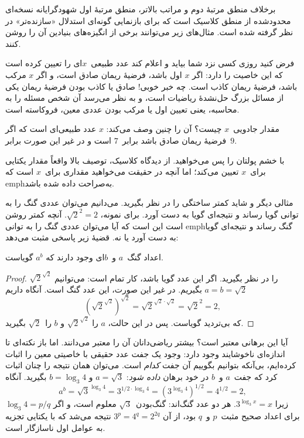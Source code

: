 \documentclass[../../../include/open-logic-section]{subfiles}
\begin{document}


برخلاف منطق مرتبهٔ دوم و مراتب بالاتر، منطق مرتبهٔ اول شهودگرایانه
نسخه‌ای محدودشده از منطق کلاسیک است که برای بازنمایی گونه‌ای استدلال
«سازنده‌تر» در نظر گرفته شده است. مثال‌های زیر می‌توانند برخی از
انگیزه‌های بنیادین آن را روشن کنند.

فرض کنید روزی کسی نزد شما بیاید و اعلام کند عدد طبیعی~$x$ای را تعیین
کرده است که این خاصیت را دارد: اگر $x$ اول باشد، فرضیهٔ ریمان صادق است،
و اگر $x$ مرکب باشد، فرضیهٔ ریمان کاذب است. چه خبر خوبی!{} صادق یا کاذب
بودن فرضیهٔ ریمان یکی از مسائل بزرگ حل‌نشدهٔ ریاضیات است، و به نظر
می‌رسد آن شخص مسئله را به محاسبه، یعنی تعیین اول یا مرکب بودن عددی
معین، فروکاسته است.

مقدار جادویی~$x$ چیست؟ آن را چنین وصف می‌کند: $x$ عدد طبیعی‌ای است که
اگر فرضیهٔ ریمان صادق باشد برابر~$7$ است و در غیر این صورت برابر~$9$.

با خشم پولتان را پس می‌خواهید. از دیدگاه کلاسیک، توصیف بالا واقعاً
مقدار یکتایی برای~$x$ تعیین می‌کند؛ اما آنچه در حقیقت می‌خواهید مقداری
برای~$x$ است که emph{به‌صراحت} داده شده باشد.

مثالی دیگر و شاید کمتر ساختگی را در نظر بگیرید. می‌دانیم می‌توان عددی
گنگ را به توانی گویا رساند و نتیجه‌ای گویا به دست آورد. برای نمونه،
$\sqrt{2}^2 = 2$. آنچه کمتر روشن است این است که آیا می‌توان عددی گنگ
را به توانی emph{گنگ} رساند و نتیجه‌ای گویا به دست آورد یا نه. قضیهٔ
زیر پاسخی مثبت می‌دهد:

\begin{thm}
اعداد گنگ~$a$ و~$b$ای وجود دارند که $a^b$ گویاست.
\end{thm}

\begin{proof}
$\sqrt{2}^{\sqrt{2}}$ را در نظر بگیرید. اگر این عدد گویا باشد، کار
تمام است: می‌توانیم $a = b = \sqrt{2}$ بگیریم. در غیر این صورت، این
عدد گنگ است. آنگاه داریم
\[
(\sqrt{2}^{\sqrt{2}})^{\sqrt{2}} = \sqrt{2}^{\sqrt{2} \cdot
  \sqrt{2}} = \sqrt{2}^2 = 2,
\]
که بی‌تردید گویاست. پس در این حالت، $a$ را
$\sqrt{2}^{\sqrt{2}}$ و $b$ را~$\sqrt 2$ بگیرید.
\end{proof}

آیا این برهانی معتبر است؟ بیشتر ریاضی‌دانان آن را معتبر می‌دانند. اما
باز نکته‌ای تا اندازه‌ای ناخوشایند وجود دارد: وجود یک جفت عدد حقیقی با
خاصیتی معین را اثبات کرده‌ایم، بی‌آنکه بتوانیم بگوییم آن جفت
\emph{کدام} است. می‌توان همان نتیجه را چنان اثبات کرد که جفت~$a$ و~$b$
در خود برهان \emph{داده شود}: $a = \sqrt{3}$ و $b = \log_3 4$ بگیرید.
آنگاه
\[
a^b = \sqrt{3}^{\log_3 4} = 3^{1/2 \cdot \log_3 4} = (3^{\log_3
  4})^{1/2} = 4^{1/2}= 2,
\]
زیرا $3^{\log_3 x} = x$. هر دو عدد گنگ‌اند: گنگ‌بودن~$\sqrt3$ معلوم
است، و اگر $\log_3 4=p/q$ برای اعداد صحیح مثبت~$p$ و~$q$ بود، از آن
$3^p=4^q=2^{2q}$ نتیجه می‌شد که با یکتایی تجزیه به عوامل اول ناسازگار
است.
\end{document}
